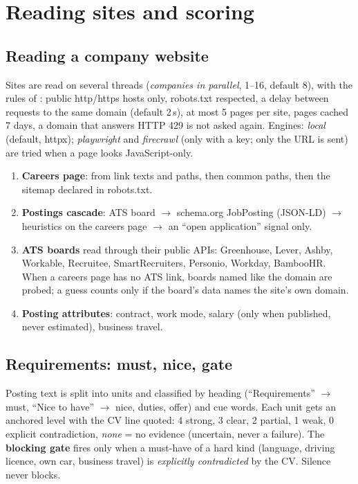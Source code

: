 \chapter{Reading sites and scoring}\label{ch:scoring}

\section{Reading a company website}
Sites are read on several threads (\emph{companies in parallel}, 1--16, default 8),
with the rules of : public http/https hosts only, robots.txt
respected, a delay between requests to the same domain (default 2\,s), at most 5 pages
per site, pages cached 7 days, a domain that answers HTTP 429 is not asked again.
Engines: \emph{local} (default, httpx); \emph{playwright} and \emph{firecrawl}
(only with a key; only the URL is sent) are tried when a page looks JavaScript-only.

\begin{enumerate}[leftmargin=1.5em]
  \item \textbf{Careers page}: from link texts and paths, then common paths, then the
        sitemap declared in robots.txt.
  \item \textbf{Postings cascade}: ATS board $\rightarrow$ schema.org JobPosting
        (JSON-LD) $\rightarrow$ heuristics on the careers page $\rightarrow$ an
        ``open application'' signal only.
  \item \textbf{ATS boards} read through their public APIs: Greenhouse, Lever, Ashby,
        Workable, Recruitee, SmartRecruiters, Personio, Workday, BambooHR. When a
        careers page has no ATS link, boards named like the domain are probed; a guess
        counts only if the board's data names the site's own domain.
  \item \textbf{Posting attributes}: contract, work mode, salary (only when published,
        never estimated), business travel.
\end{enumerate}

\section{Requirements: must, nice, gate}
Posting text is split into units and classified by heading (``Requirements'' $\to$
must, ``Nice to have'' $\to$ nice, duties, offer) and cue words. Each unit gets an
anchored level with the CV line quoted: 4 strong, 3 clear, 2 partial, 1 weak,
0 explicit contradiction, \emph{none} = no evidence (uncertain, never a failure).
The \textbf{blocking gate} fires only when a must-have of a hard kind (language,
driving licence, own car, business travel) is \emph{explicitly contradicted} by the
CV. Silence never blocks.

